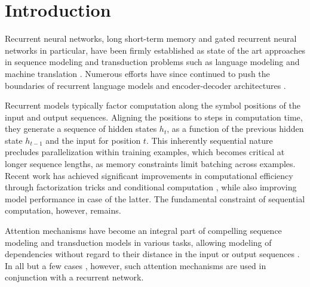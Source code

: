 \documentclass{article}
\begin{document}
\section{Introduction}


Recurrent neural networks, long short-term memory \citep{hochreiter1997} and gated recurrent \citep{gruEval14} neural networks in particular, have been firmly established as state of the art approaches in sequence modeling and transduction problems such as language modeling and machine translation \citep{sutskever14, bahdanau2014neural, cho2014learning}. Numerous efforts have since continued to push the boundaries of recurrent language models and encoder-decoder architectures \citep{wu2016google,luong2015effective,jozefowicz2016exploring}.

Recurrent models typically factor computation along the symbol positions of the input and output sequences. Aligning the positions to steps in computation time, they generate a sequence of hidden states $h_t$, as a function of the previous hidden state $h_{t-1}$ and the input for position $t$. This inherently sequential nature precludes parallelization within training examples, which becomes critical at longer sequence lengths, as memory constraints limit batching across examples.
Recent work has achieved significant improvements in computational efficiency through factorization tricks \citep{Kuchaiev2017Factorization} and conditional computation \citep{shazeer2017outrageously}, while also improving model performance in case of the latter. The fundamental constraint of sequential computation, however, remains.


Attention mechanisms have become an integral part of compelling sequence modeling and transduction models in various tasks, allowing modeling of dependencies without regard to their distance in the input or output sequences \citep{bahdanau2014neural, structuredAttentionNetworks}. In all but a few cases \citep{decomposableAttnModel}, however, such attention mechanisms are used in conjunction with a recurrent network.

\end{document}
